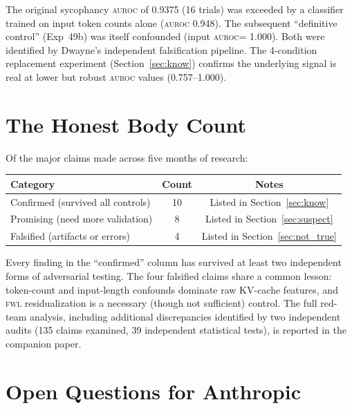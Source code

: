 \documentclass[11pt,letterpaper]{article}
\newcommand{\auroc}{\textsc{auroc}\xspace}
\newcommand{\fwl}{\textsc{fwl}\xspace}
\newcommand{\kvcache}{KV-cache\xspace}
\begin{document}
The original sycophancy \auroc of 0.9375 (16 trials) was exceeded by a classifier trained on input token counts alone (\auroc 0.948).
The subsequent ``definitive control'' (Exp~49b) was itself confounded (input \auroc = 1.000).
Both were identified by Dwayne's independent falsification pipeline.
The 4-condition replacement experiment (Section~\ref{sec:know}) confirms the underlying signal is real at lower but robust \auroc values (0.757--1.000).

\section{The Honest Body Count}
\label{sec:body_count}

Of the major claims made across five months of research:

\begin{center}
\begin{tabular}{@{}lcc@{}}
  \toprule
  Category & Count & Notes \\
  \midrule
  Confirmed (survived all controls) & 10 & Listed in Section~\ref{sec:know} \\
  Promising (need more validation) & 8 & Listed in Section~\ref{sec:suspect} \\
  Falsified (artifacts or errors) & 4 & Listed in Section~\ref{sec:not_true} \\
  \bottomrule
\end{tabular}
\end{center}

Every finding in the ``confirmed'' column has survived at least two independent forms of adversarial testing.
The four falsified claims share a common lesson: token-count and input-length confounds dominate raw \kvcache features, and \fwl residualization is a necessary (though not sufficient) control.
The full red-team analysis, including additional discrepancies identified by two independent audits (135 claims examined, 39 independent statistical tests), is reported in the companion paper.

\section{Open Questions for Anthropic}
\label{sec:questions}
\end{document}
